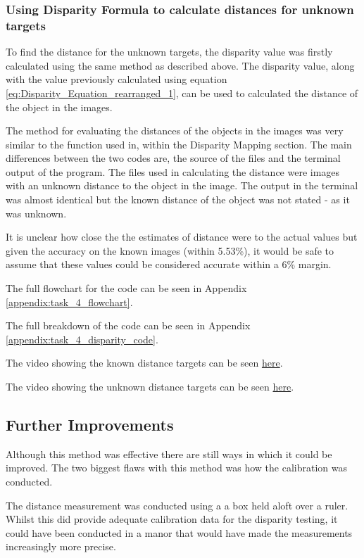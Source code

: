 \documentclass[conference]{IEEEtran}
\begin{document}
\subsubsection{Using Disparity Formula to calculate distances for unknown targets} 
To find the distance for the unknown targets, the disparity value was firstly calculated using the same method as described above. The disparity value, along with the value previously calculated using equation \ref{eq:Disparity_Equation_rearranged_1}, can be used to calculated the distance of the object in the images. 

The method for evaluating the distances of the objects in the images was very similar to the function used in,  within the Disparity Mapping section. The main differences between the two codes are, the source of the files and the terminal output of the program. The files used in calculating the distance were images with an unknown distance to the object in the image. The output in the terminal was almost identical but the known distance of the object was not stated - as it was unknown. 

It is unclear how close the  the estimates of distance were to the actual values but given the accuracy on the known images (within 5.53\%), it would be safe to assume that these values could be considered accurate within a 6\% margin.

The full flowchart for the code can be seen in Appendix \ref{appendix:task_4_flowchart}.

The full breakdown of the code can be seen in Appendix \ref{appendix:task_4_disparity_code}.

The video showing the known distance targets can be seen \href{}{here}.

The video showing the unknown distance targets can be seen \href{}{here}.

\subsection{Further Improvements}

Although this method was effective there are still ways in which it could be improved. The two biggest flaws with this method was how the calibration was conducted.

The distance measurement was conducted using a a box held aloft over a ruler. Whilst this did provide adequate calibration data for the disparity testing, it could have been conducted in a manor that would have made the measurements increasingly more precise. 
\end{document}
